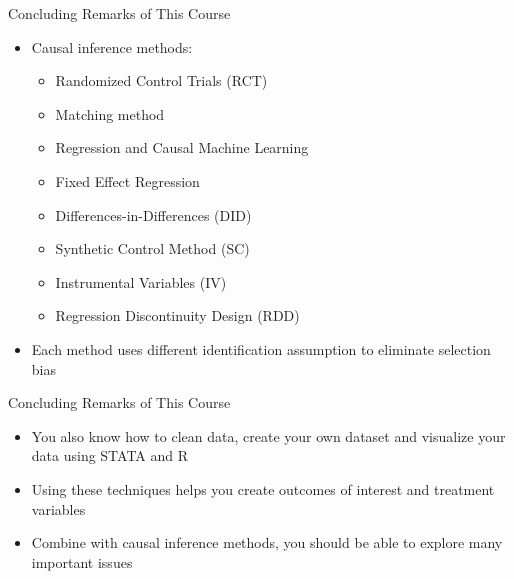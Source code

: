 \documentclass[dvipsnames,hyperref={pdfpagelabels=false}]{beamer}
\begin{document}
\begin{frame}{Concluding Remarks of This Course}
	\begin{itemize}
		\item Causal inference methods:
		\vspace{0.2cm}
		\begin{itemize}			
			\item[1] Randomized Control Trials (RCT)
			\vspace{0.2cm}
			\item[2] Matching method 
			\vspace{0.2cm}
			\item[3] Regression and Causal Machine Learning
			\vspace{0.2cm}
				\item[4] Fixed Effect Regression
			\vspace{0.2cm}
			\item[5] Differences-in-Differences (DID)
			\vspace{0.2cm}
			\item[6] Synthetic Control Method (SC)
				\vspace{0.2cm}
			\item[7] Instrumental Variables (IV)
			\vspace{0.2cm}
			\item[8] Regression Discontinuity Design (RDD)
		
			\vspace{0.2cm}
		\end{itemize}
		\item Each method uses different identification assumption to eliminate selection bias
	\end{itemize}
\end{frame}



\begin{frame}{Concluding Remarks of This Course}
\begin{itemize}
\item You also know how to clean data, create your own dataset and visualize your data using STATA and R 
\vspace{0.2cm}
\item Using these techniques helps you create outcomes of interest and treatment variables
\vspace{0.2cm}
\item Combine with causal inference methods, you should be able to explore many important issues
\end{itemize}
\end{frame}
\end{document}
